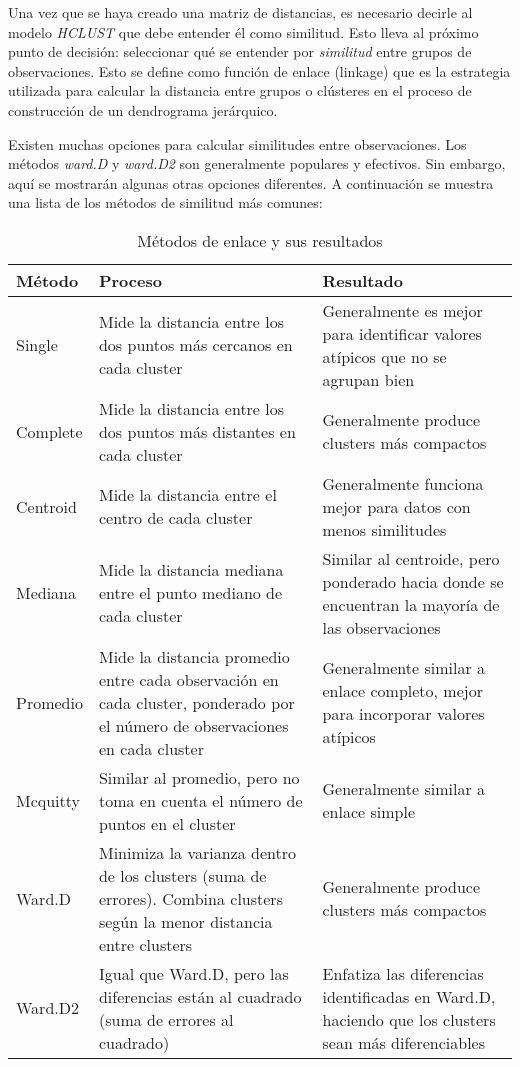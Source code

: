 Una vez que se haya creado una matriz de distancias, es necesario decirle al modelo \textit{HCLUST} que debe entender él como similitud. Esto lleva al próximo punto de decisión: seleccionar qué se entender por \textit{similitud} entre grupos de observaciones. Esto se define como función de enlace (linkage) que es la estrategia utilizada para calcular la distancia entre grupos o clústeres en el proceso de construcción de un dendrograma jerárquico.

Existen muchas opciones para calcular similitudes entre observaciones. Los métodos \textit{ward.D} y \textit{ward.D2} son generalmente populares y efectivos. Sin embargo, aquí se mostrarán algunas otras opciones diferentes. A continuación se muestra una lista de los métodos de similitud más comunes:

\begin{table}[H]
    \centering
    \begin{tabular}{|p{3.5cm}|p{6cm}|p{6cm}|}
    \hline
    \textbf{Método} & \textbf{Proceso} & \textbf{Resultado} \\
    \hline
    Single & Mide la distancia entre los dos puntos más cercanos en cada cluster & Generalmente es mejor para identificar valores atípicos que no se agrupan bien \\
    \hline
    Complete & Mide la distancia entre los dos puntos más distantes en cada cluster & Generalmente produce clusters más compactos \\
    \hline
    Centroid & Mide la distancia entre el centro de cada cluster & Generalmente funciona mejor para datos con menos similitudes \\
    \hline
    Mediana & Mide la distancia mediana entre el punto mediano de cada cluster & Similar al centroide, pero ponderado hacia donde se encuentran la mayoría de las observaciones \\
    \hline
    Promedio & Mide la distancia promedio entre cada observación en cada cluster, ponderado por el número de observaciones en cada cluster & Generalmente similar a enlace completo, mejor para incorporar valores atípicos \\
    \hline
    Mcquitty & Similar al promedio, pero no toma en cuenta el número de puntos en el cluster & Generalmente similar a enlace simple \\
    \hline
    Ward.D & Minimiza la varianza dentro de los clusters (suma de errores). Combina clusters según la menor distancia entre clusters & Generalmente produce clusters más compactos \\
    \hline
    Ward.D2 & Igual que Ward.D, pero las diferencias están al cuadrado (suma de errores al cuadrado) & Enfatiza las diferencias identificadas en Ward.D, haciendo que los clusters sean más diferenciables \\
    \hline
    \end{tabular}
    \caption{Métodos de enlace y sus resultados}
\end{table}

